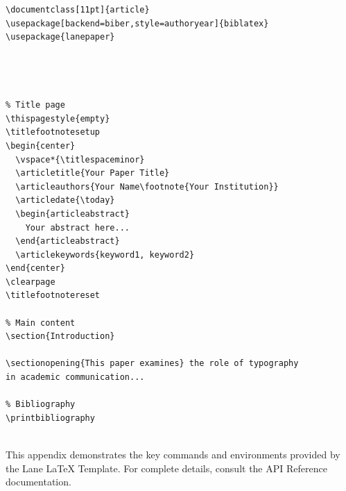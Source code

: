 \begin{verbatim}
\documentclass[11pt]{article}
\usepackage[backend=biber,style=authoryear]{biblatex}
\usepackage{lanepaper}




% Title page
\thispagestyle{empty}
\titlefootnotesetup
\begin{center}
  \vspace*{\titlespaceminor}
  \articletitle{Your Paper Title}
  \articleauthors{Your Name\footnote{Your Institution}}
  \articledate{\today}
  \begin{articleabstract}
    Your abstract here...
  \end{articleabstract}
  \articlekeywords{keyword1, keyword2}
\end{center}
\clearpage
\titlefootnotereset

% Main content
\section{Introduction}

\sectionopening{This paper examines} the role of typography
in academic communication...

% Bibliography
\printbibliography


\end{verbatim}

This appendix demonstrates the key commands and environments provided by the Lane LaTeX Template. For complete details, consult the API Reference documentation.
